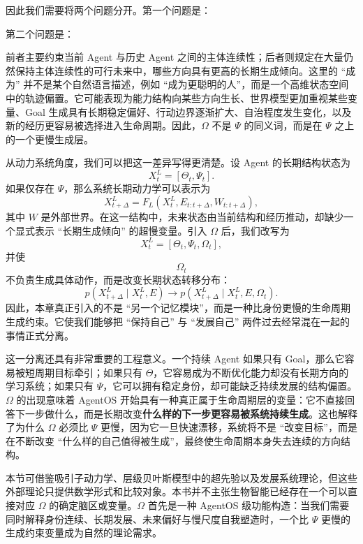 因此我们需要将两个问题分开。第一个问题是：
\begin{statementbox}
\centering
{}
\end{statementbox}
第二个问题是：
\begin{statementbox}
\centering
{}
\end{statementbox}
前者主要约束当前 Agent 与历史 Agent 之间的主体连续性；后者则规定在大量仍然保持主体连续性的可行未来中，哪些方向具有更高的长期生成倾向。这里的 ``成为'' 并不是某个自然语言描述，例如 ``成为更聪明的人''，而是一个高维状态空间中的轨迹偏置。它可能表现为能力结构向某些方向生长、世界模型更加重视某些变量、Goal 生成具有长期稳定偏好、行动边界逐渐扩大、自治程度发生变化，以及新的经历更容易被选择进入生命周期。因此，$\Omega$ 不是 $\Psi$ 的同义词，而是在 $\Psi$ 之上的一个更慢生成层。

从动力系统角度，我们可以把这一差异写得更清楚。设 Agent 的长期结构状态为
\[
X_t^{L}
=
\left[
\Theta_t,\Psi_t
\right].
\]
如果仅存在 $\Psi$，那么系统长期动力学可以表示为
\[
X_{t+\Delta}^{L}
=
F_L
\left(
X_t^{L},
E_{t:t+\Delta},
W_{t:t+\Delta}
\right),
\]
其中 $W$ 是外部世界。在这一结构中，未来状态由当前结构和经历推动，却缺少一个显式表示 ``长期生成倾向'' 的超慢变量。引入 $\Omega$ 后，我们改写为
\[
X_t^{L}
=
\left[
\Theta_t,\Psi_t,\Omega_t
\right],
\]
并使
\[
\Omega_t
\]
不负责生成具体动作，而是改变长期状态转移分布：
\[
p
\left(
X_{t+\Delta}^{L}
\mid
X_t^{L},E
\right)
\longrightarrow
p
\left(
X_{t+\Delta}^{L}
\mid
X_t^{L},E,\Omega_t
\right).
\]
因此，本章真正引入的不是 ``另一个记忆模块''，而是一种比身份更慢的生命周期生成约束。它使我们能够把 ``保持自己'' 与 ``发展自己'' 两件过去经常混在一起的事情正式分离。

这一分离还具有非常重要的工程意义。一个持续 Agent 如果只有 Goal，那么它容易被短周期目标牵引；如果只有 $\Theta$，它容易成为不断优化能力却没有长期方向的学习系统；如果只有 $\Psi$，它可以拥有稳定身份，却可能缺乏持续发展的结构偏置。$\Omega$ 的出现意味着 AgentOS 开始具有一种真正属于生命周期层的变量：它不直接回答下一步做什么，而是长期改变\textbf{什么样的下一步更容易被系统持续生成}。这也解释了为什么 $\Omega$ 必须比 $\Psi$ 更慢，因为它一旦快速漂移，系统将不是 ``改变目标''，而是在不断改变 ``什么样的自己值得被生成''，最终使生命周期本身失去连续的方向结构。

本节可借鉴吸引子动力学、层级贝叶斯模型中的超先验以及发展系统理论，但这些外部理论只提供数学形式和比较对象。本书并不主张生物智能已经存在一个可以直接对应 $\Omega$ 的确定脑区或变量。$\Omega$ 首先是一种 AgentOS 级功能构造：当我们需要同时解释身份连续、长期发展、未来偏好与慢尺度自我塑造时，一个比 $\Psi$ 更慢的生成约束变量成为自然的理论需求。

